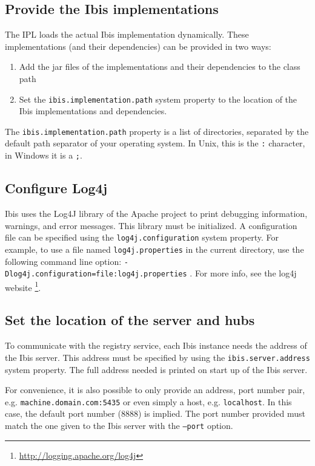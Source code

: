 \documentclass[a4paper,10pt]{article}
\begin{document}
\subsection{Provide the Ibis implementations}

The IPL loads the actual Ibis implementation dynamically. 
These implementations (and their dependencies) can be provided in two 
ways:

\begin{enumerate} 
\item Add the jar files of the implementations and their dependencies to
      the class path 
\item Set the \texttt{ibis.implementation.path} system property to the
      location of the Ibis implementations and dependencies.  
\end{enumerate}

The \texttt{ibis.implementation.path} property is a list of directories,
separated by the default path separator of your operating system. In
Unix, this is the \texttt{:} character, in Windows it is a \texttt{;}.

\subsection{Configure Log4j}

Ibis uses the Log4J library of the Apache project to print debugging
information, warnings, and error messages. This library must be
initialized. A configuration file can be specified using the
\texttt{log4j.configuration} system property. For example, to use a file
named \texttt{log4j.properties} in the current directory, use the
following command line option:
\texttt{-Dlog4j.configuration=file:log4j.properties} . For more info,
see the log4j website \footnote{\url{http://logging.apache.org/log4j}}.

\subsection{Set the location of the server and hubs}

To communicate with the registry service, each Ibis instance needs the address 
of the Ibis server. This address must be specified by using the 
\texttt{ibis.server.address} system property. The full address needed is 
printed on start up of the Ibis server. 

For convenience, it is also possible to only provide an address, port number 
pair, e.g. \texttt{machine.domain.com:5435} or even simply a host, e.g. 
\texttt{localhost}. In this case, the default port number (8888) is implied. 
The port number provided must match the one given to the Ibis server
with the \texttt{--port} option.
\end{document}
